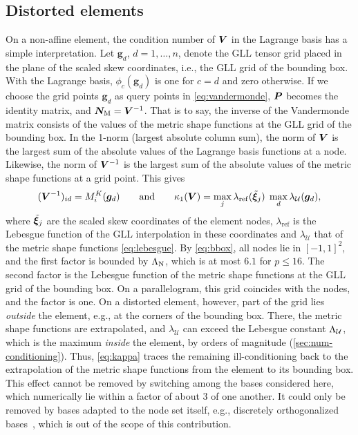 \subsection{Distorted elements}
\label{sec:basis-distorted}
%
On a non-affine element, the condition number of $\bm{V}$ in the Lagrange basis has a simple interpretation. Let $\bm g_d$, $d=1,\dots,n$, denote the GLL tensor grid placed in the plane of the scaled skew coordinates, i.e., the GLL grid of the bounding box. With the Lagrange basis, $\phi_c(\bm g_d)$ is one for $c=d$ and zero otherwise. If we choose the grid points $\bm g_d$ as query points in \cref{eq:vandermonde}, $\bm{P}$ becomes the identity matrix, and $\bm{N}_{\mathrm M}=\bm{V}^{-1}$. That is to say, the inverse of the Vandermonde matrix consists of the values of the metric shape functions at the GLL grid of the bounding box. In the 1-norm (largest absolute column sum), the norm of $\bm{V}$ is the largest sum of the absolute values of the Lagrange basis functions at a node. Likewise, the norm of $\bm{V}^{-1}$ is the largest sum of the absolute values of the metric shape functions at a grid point. This gives
%
\begin{equation}
  (\bm{V}^{-1})_{id}=M_i^K(\bm g_d)\qquad\text{and}\qquad
  \kappa_1(\bm{V})=\max_j\lambda_{\mathrm{ref}}(\tilde{\bm\xi}_j)\;\max_d\lambda_{\mathcal U}(\bm g_d) ,
  \label{eq:kappa}
\end{equation}
%
where $\tilde{\bm\xi}_j$ are the scaled skew coordinates of the element nodes, $\lambda_{\mathrm{ref}}$ is the Lebesgue function of the GLL interpolation in these coordinates and $\lambda_{\mathcal U}$ that of the metric shape functions \cref{eq:lebesgue}. By \cref{eq:bbox}, all nodes lie in $[-1,1]^2$, and the first factor is bounded by $\Lambda_{\mathrm{N}}$, which is at most $6.1$ for $p\le16$. The second factor is the Lebesgue function of the metric shape functions at the GLL grid of the bounding box. On a parallelogram, this grid coincides with the nodes, and the factor is one. On a distorted element, however, part of the grid lies \emph{outside} the element, e.g., at the corners of the bounding box. There, the metric shape functions are extrapolated, and $\lambda_{\mathcal U}$ can exceed the Lebesgue constant $\Lambda_{\mathcal U}$, which is the maximum \emph{inside} the element, by orders of magnitude (\cref{sec:num-conditioning}). Thus, \cref{eq:kappa} traces the remaining ill-conditioning back to the extrapolation of the metric shape functions from the element to its bounding box. This effect cannot be removed by switching among the bases considered here, which numerically lie within a factor of about 3 of one another. It could only be removed by bases adapted to the node set itself, e.g., discretely orthogonalized bases~\cite{Brubeck2021Vandermonde}, which is out of the scope of this contribution.

